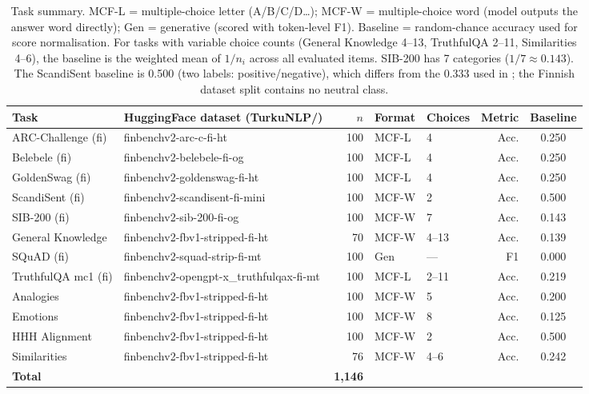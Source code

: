 \documentclass[11pt]{article}
\begin{document}
\begin{table}[h]
\centering
\small
\begin{tabular}{llrllrc}
\toprule
\textbf{Task} & \textbf{HuggingFace dataset (TurkuNLP/)} & \textbf{$n$} & \textbf{Format} & \textbf{Choices} & \textbf{Metric} & \textbf{Baseline} \\
\midrule
ARC-Challenge (fi)  & finbenchv2-arc-c-fi-ht                    & 100 & MCF-L & 4       & Acc.   & 0.250 \\
Belebele (fi)       & finbenchv2-belebele-fi-og                 & 100 & MCF-L & 4       & Acc.   & 0.250 \\
GoldenSwag (fi)     & finbenchv2-goldenswag-fi-ht               & 100 & MCF-L & 4       & Acc.   & 0.250 \\
ScandiSent (fi)     & finbenchv2-scandisent-fi-mini             & 100 & MCF-W & 2       & Acc.   & 0.500 \\
SIB-200 (fi)        & finbenchv2-sib-200-fi-og                  & 100 & MCF-W & 7       & Acc.   & 0.143 \\
General Knowledge   & finbenchv2-fbv1-stripped-fi-ht            &  70 & MCF-W & 4--13   & Acc.   & 0.139 \\
SQuAD (fi)          & finbenchv2-squad-strip-fi-mt              & 100 & Gen   & —       & F1     & 0.000 \\
TruthfulQA mc1 (fi) & finbenchv2-opengpt-x\_truthfulqax-fi-mt   & 100 & MCF-L & 2--11   & Acc.   & 0.219 \\
Analogies           & finbenchv2-fbv1-stripped-fi-ht            & 100 & MCF-W & 5       & Acc.   & 0.200 \\
Emotions            & finbenchv2-fbv1-stripped-fi-ht            & 100 & MCF-W & 8       & Acc.   & 0.125 \\
HHH Alignment       & finbenchv2-fbv1-stripped-fi-ht            & 100 & MCF-W & 2       & Acc.   & 0.500 \\
Similarities        & finbenchv2-fbv1-stripped-fi-ht            &  76 & MCF-W & 4--6    & Acc.   & 0.242 \\
\midrule
\textbf{Total}      &                                           & \textbf{1{,}146} & & & & \\
\bottomrule
\end{tabular}
\caption{Task summary. MCF-L = multiple-choice letter (A/B/C/D…);
  MCF-W = multiple-choice word (model outputs the answer word directly);
  Gen = generative (scored with token-level F1).
  Baseline = random-chance accuracy used for score normalisation.
  For tasks with variable choice counts (General Knowledge 4--13,
  TruthfulQA 2--11, Similarities 4--6), the baseline is the weighted mean
  of $1/n_i$ across all evaluated items.
  SIB-200 has 7 categories ($1/7 \approx 0.143$).
  The ScandiSent baseline is 0.500 (two labels: positive/negative),
  which differs from the 0.333 used in \citet{kytoniemi2025};
  the Finnish dataset split contains no neutral class.}
\label{tab:dataset_stats}
\end{table}
\end{document}
